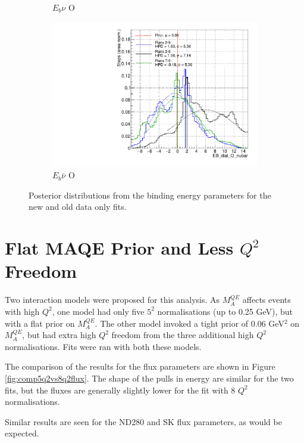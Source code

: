 \begin{figure}
\begin{subfigure}{.48\textwidth}
  \caption{$E_{b}\nu$ O}
\end{subfigure}
\begin{subfigure}{.48\textwidth}
  \centering
  \includegraphics[width=0.73\linewidth]{figs/Runs_EB_dial_O_nubar}
  \caption{$E_{b}\bar{\nu}$ O}
\end{subfigure}
\caption{Posterior distributions from the binding energy parameters for the new and old data only fits.}
\label{fig:RunsEbdata}
\end{figure}

\section{Flat MAQE Prior and Less $Q^2$ Freedom}

Two interaction models were proposed for this analysis. As $M_{A}^{QE}$ affects events with high $Q^{2}$, one model had only five $5^2$ normalisations (up to 0.25 GeV), but with a flat prior on $M_{A}^{QE}$. The other model invoked a tight prior of 0.06 GeV$^2$ on $M_{A}^{QE}$, but had extra high $Q^2$ freedom from the three additional high $Q^2$ normalisations. Fits were ran with both these models.

The comparison of the results for the flux parameters are shown in Figure \ref{fig:comp5q2vs8q2flux}. The shape of the pulls in energy are similar for the two fits, but the fluxes are generally slightly lower for the fit with 8 $Q^2$ normalisations.

Similar results are seen for the ND280 and SK flux parameters, as would be expected.


